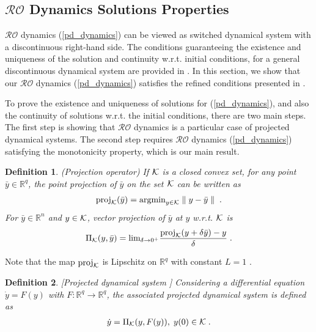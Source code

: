 \documentclass[journal,twoside,web]{ieeecolor}
\newcommand{\rev}[1]{\textcolor{revisionblue}{#1}}
\newtheorem{definition}{Definition}
\begin{document}
\subsection*{\rev{$\mathcal{RO}$ Dynamics Solutions Properties}}\label{existence.sec}
$\mathcal{RO}$ dynamics (\ref{pd_dynamics}) can be viewed as switched dynamical system with a discontinuous right-hand side. The conditions guaranteeing the existence and uniqueness of the solution and continuity w.r.t. initial conditions, for a general discontinuous dynamical system are provided in \cite[Theorem~2.5]{nagurney2012projected}. In this section, we show that our $\mathcal{RO}$ dynamics (\ref{pd_dynamics}) satisfies the refined conditions presented in \cite{cherukuri2016}.

To prove the existence and uniqueness of solutions for (\ref{pd_dynamics}), and also the continuity of solutions w.r.t. the initial conditions, there are two main steps. The first step is showing that $\mathcal{RO}$ dynamics is a particular case of projected dynamical systems. The second step requires $\mathcal{RO}$ dynamics (\ref{pd_dynamics}) satisfying the monotonicity property, which is our main result.

\begin{definition} \label{projection_operator} (Projection operator)
If ${\cal K}$ is a closed convex set, for any point $\bar y \in \mathbb R^q$, the point projection of $\bar y$ on the set ${\cal K}$ can be written as
\begin{align*}
\text{proj}_{\cal K}(\bar y)=\text{argmin}_{y \in {\cal K}} \parallel y-\bar y \parallel\;.
\end{align*}
For $\bar y \in \mathbb R^n$ and $y \in {\cal K}$, vector projection of $\bar y$ at $y$ w.r.t. ${\cal K}$ is
\begin{align}
\label{projection_operator_eq}
\Pi_{\cal K}(y,\bar y) = \text{lim}_{\delta \rightarrow 0^+} \frac{\text{proj}_{\cal K}(y+\delta \bar y)-y}{\delta}\;.
\end{align}
\end{definition}

Note that the map $\text{proj}_{\cal K}$ is Lipschitz on $\mathbb R^q$ with constant $L=1$ \cite[Proposition~2.4.1]{clarke1983}.

\begin{definition} \label{projected_dynamical_system} [Projected dynamical system \cite{nagurney1996}]
Considering a differential equation $\dot y=F(y)$ with $F:\mathbb R^q \rightarrow \mathbb R^q$, the associated projected dynamical system is defined as
\begin{align}
\label{projected_dynamics}
\dot y = \Pi_{\cal K}(y,F(y)),\; y(0) \in {\cal K}\;.
\end{align}
\end{definition}
\end{document}
